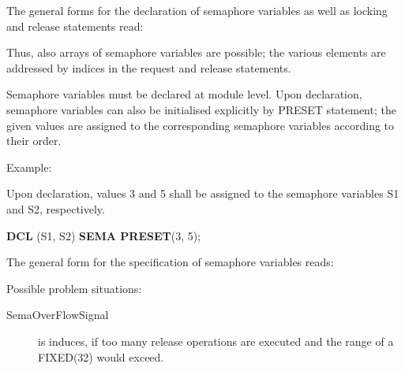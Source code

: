 The general forms for the declaration of semaphore variables as well as
locking and release statements read:









Thus, also arrays of semaphore variables are possible; the various
elements are addressed by indices in the request and release
statements.

Semaphore variables must be declared at module level. Upon declaration,
semaphore variables can also be initialised explicitly by PRESET
statement; the given values are assigned to the corresponding
semaphore variables according to their order.

Example:

Upon declaration, values 3 and 5 shall be assigned to the semaphore
variables S1 and S2, respectively.

{\bf DCL} (S1, S2) {\bf SEMA PRESET}(3, 5);

The general form for the specification of semaphore variables reads:



Possible problem situations:

\begin{description}
\item[SemaOverFlowSignal] is induces, if too many release operations
   are executed and the range of a FIXED(32) would exceed.
\end{description}

